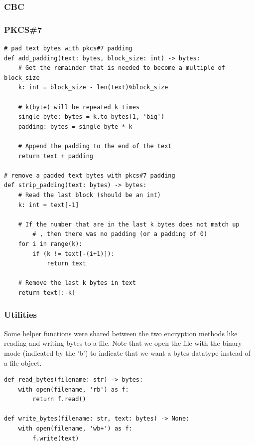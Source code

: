 \documentclass[11pt]{article}
\begin{document}
\subsubsection*{CBC}
\subsubsection*{PKCS\#7} 
\begin{framed}
\begin{verbatim}
# pad text bytes with pkcs#7 padding
def add_padding(text: bytes, block_size: int) -> bytes:
    # Get the remainder that is needed to become a multiple of block_size
    k: int = block_size - len(text)%block_size

    # k(byte) will be repeated k times
    single_byte: bytes = k.to_bytes(1, 'big')
    padding: bytes = single_byte * k

    # Append the padding to the end of the text 
    return text + padding 

# remove a padded text bytes with pkcs#7 padding
def strip_padding(text: bytes) -> bytes:
    # Read the last block (should be an int)
    k: int = text[-1]

    # If the number that are in the last k bytes does not match up
		# , then there was no padding (or a padding of 0)
    for i in range(k):
        if (k != text[-(i+1)]):
            return text 

    # Remove the last k bytes in text 
    return text[:-k]
\end{verbatim}
\end{framed}

\subsubsection*{Utilities}
Some helper functions were shared between the two encryption methods like reading and writing bytes to a file. Note that we open the file with the binary mode (indicated by the 'b') to indicate that we want a {\sc bytes} datatype instead of a {\sc file} object.
\begin{framed}
\begin{verbatim}
def read_bytes(filename: str) -> bytes:
    with open(filename, 'rb') as f:
        return f.read()

def write_bytes(filename: str, text: bytes) -> None:
    with open(filename, 'wb+') as f:
        f.write(text)
\end{verbatim}
\end{framed}
\end{document}

